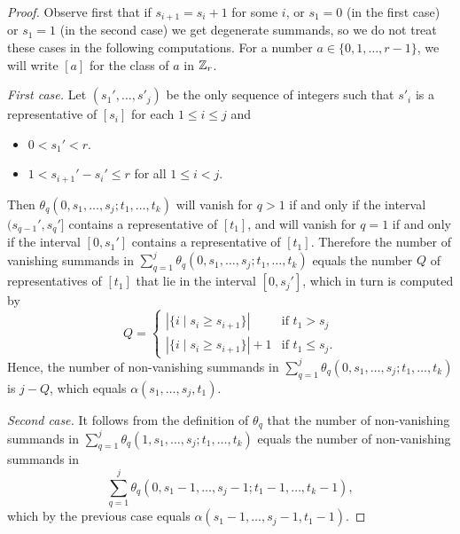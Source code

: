 \begin{proof}
	Observe first that if $s_{i+1} = s_i+1$ for some $i$, or $s_1 = 0$ (in the first case) or $s_1=1$ (in the second case) we get degenerate summands, so we do not treat these cases in the following computations.
	For a number $a\in \{0,1,\ldots,r-1\}$, we will write $[a]$ for the class of $a$ in $\mathbb{Z}_{r}$.

	{\em First case.} Let $(s_1',\ldots,s'_j)$ be the only sequence of integers such that $s'_i$ is a representative of $[s_i]$ for each $1\leq i\leq j$ and
	\begin{itemize}
		\item $0< s_1'< r$.
		\item $1<s_{i+1}'-s_i'\leq r$ for all $1\leq i<j$.
	\end{itemize}
	Then $\theta_q(0,s_1,\ldots,s_j;t_1,\ldots,t_k)$ will vanish for $q>1$ if and only if the interval $(s_{q-1}',s_q']$ contains a representative of $[t_1]$, and will vanish for $q=1$ if and only if the interval $[0,s_1']$ contains a representative of $[t_1]$.
	Therefore the number of vanishing summands in $\sum_{q=1}^j\theta_q(0,s_1,\ldots,s_j;t_1,\ldots,t_k)$ equals the number $Q$ of representatives of $[t_1]$ that lie in the interval $[0,s_j']$, which in turn is computed by
	\[
	Q = \begin{cases}
		|\{i\mid s_i\geq s_{i+1}\}| & \text{if $t_1>s_j$} \\
		|\{i\mid s_i\geq s_{i+1}\}|+1 & \text{if $t_1\leq s_j$}.
	\end{cases}
	\]
	Hence, the number of non-vanishing summands in $\sum_{q=1}^j\theta_q(0,s_1,\ldots,s_j;t_1,\ldots,t_k)$ is $j-Q$, which equals $\alpha(s_1,\ldots,s_j,t_1)$.

	{\em Second case.} It follows from the definition of $\theta_q$ that the number of non-vanishing summands in $\sum_{q=1}^j \theta_q(1,s_1,\ldots,s_j;t_1,\ldots,t_k)$ equals the number of non-vanishing summands in
	\[\sum_{q=1}^j \theta_q(0,s_1-1,\ldots,s_j-1;t_1-1,\ldots,t_k-1),\] which by the previous case equals $\alpha(s_1-1,\ldots,s_j-1,t_1-1)$.%
\end{proof}

